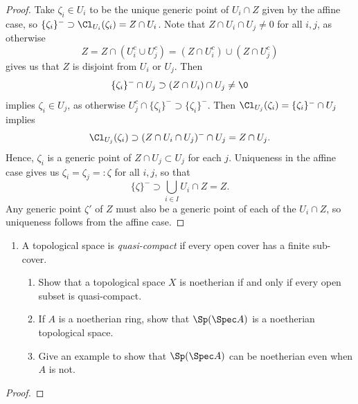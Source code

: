 \documentclass[12pt]{amsart}
\begin{document}
\begin{proof}
  Take $\zeta_i\in U_i$ to be the unique generic point of $U_i\cap Z$ given by the affine case, so $\{\zeta_i\}^-\supset \Cl_{U_i}(\zeta_i)=Z\cap U_i$.
  Note that $Z\cap U_i\cap U_j\neq 0$ for all $i,j$, as otherwise 
  \[
    Z= Z\cap (U_i^c\cup U_j^c)= (Z\cap U_i^c)\cup(Z\cap U_j^c)
  \]
  gives us that $Z$ is disjoint from $U_i$ or $U_j$.
  Then 
  \[
    \{\zeta_i\}^-\cap U_j \supset (Z\cap U_i)\cap U_j\neq \0
  \] 
  implies $\zeta_i\in U_j$, as otherwise $U_j^c\cap \{\zeta_i\}^-\supset \{\zeta_i\}^-$.
  Then $\Cl_{U_j}(\zeta_i)=\{\zeta_i\}^-\cap U_j$ implies 
  \[
    \Cl_{U_j}(\zeta_i)\supset (Z\cap U_i\cap U_j)^-\cap U_j = Z\cap U_j.
  \]
  Hence, $\zeta_i$ is a generic point of $Z\cap U_j\subset U_j$ for each $j$.
  Uniqueness in the affine case gives us $\zeta_i=\zeta_j=:\zeta$ for all $i,j$, so that
  \[
    \{\zeta\}^-\supset \bigcup_{i\in I} U_i\cap Z = Z.
  \] 
  Any generic point $\zeta'$ of $Z$ must also be a generic point of each of the $U_i\cap Z$, so uniqueness follows from the affine case.
\end{proof}

% 

\begin{enumerate}
  \item[2.13.] {
      A topological space is \emph{quasi-compact} if every open cover has a finite sub-cover.
      \begin{enumerate}
        \item Show that a topological space $X$ is noetherian if and only if every open subset is quasi-compact.
        \item If $A$ is a noetherian ring, show that $\Sp(\Spec A)$ is a noetherian topological space.
        \item Give an example to show that $\Sp(\Spec A)$ can be noetherian even when $A$ is not.
      \end{enumerate}
    }
\end{enumerate}

\begin{proof}
\end{proof}
\end{document}

